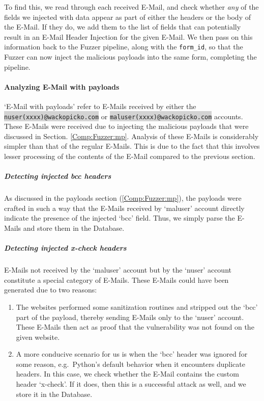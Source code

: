 To find this, we read through each received E-Mail, and check whether \emph{any} of the fields we injected with data appear as part of either the headers or the body of the E-Mail. If they do, we add them to the list of fields that can potentially result in an E-Mail Header Injection for the given E-Mail. We then pass on this information back to the Fuzzer pipeline, along with the \lstinline{form_id}, so that the Fuzzer can now inject the malicious payloads into the same form, completing the pipeline.

\paragraph{Analyzing E-Mail with payloads}
`E-Mail with payloads' refer to E-Mails received by either the \colorbox{lightgray}{\lstinline{nuser(xxxx)@wackopicko.com}} or \colorbox{lightgray}{\lstinline{maluser(xxxx)@wackopicko.com}} accounts. These E-Mails were received due to injecting the malicious payloads that were discussed in Section. \ref{Comp:Fuzzer:mp}. Analysis of these E-Mails is considerably simpler than that of the regular E-Mails. This is due to the fact that this involves lesser processing of the contents of the E-Mail compared to the previous section.
\subparagraph{Detecting injected bcc headers}
As discussed in the payloads section (\ref{Comp:Fuzzer:mp}), the payloads were crafted in such a way that the E-Mails received by `maluser' account directly indicate the presence of the injected `bcc' field. Thus, we simply parse the E-Mails and store them in the Database.

\label{analyze:detect_x_check}
\subparagraph{Detecting injected x-check headers}
E-Mails not received by the `maluser' account but by the `nuser' account constitute a special category of E-Mails.
These E-Mails could have been generated due to two reasons:
\begin{enumerate}
	\item The websites performed some sanitization routines and stripped out the `bcc' part of the payload, thereby sending E-Mails only to the `nuser' account. These E-Mails then act as proof that the vulnerability was not found on the given website.
	\item A more conducive scenario for us is when the `bcc' header was ignored for some reason, e.g.\ Python's default behavior when it encounters duplicate headers. In this case, we check whether the E-Mail contains the custom header `x-check'. If it does, then this is a successful attack as well, and we store it in the Database.
\end{enumerate}
